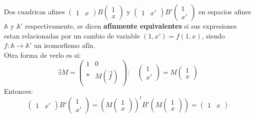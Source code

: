 \begin{definición}
    Dos cuadricas afines $\begin{pmatrix} 1 & x \end{pmatrix} B \begin{pmatrix} 1 \\ x \end{pmatrix}$ y $\begin{pmatrix} 1 & x' \end{pmatrix} B' \begin{pmatrix} 1 \\ x' \end{pmatrix}$ en espacios afines $\mathbb{A}$ y $\mathbb{A}'$ respectivamente, se dicen \textbf{afínmente equivalentes} si sus expresiones estan relacionadas por un cambio de variable $(1, x') = f(1, x)$, siendo $f : \mathbb{A} \to \mathbb{A}'$ un isomorfismo afín.\\
    Otra forma de verlo es si:
    \[
    \exists M =
    \left(
        \begin{array}{c|c}
            1 & 0 \\
            \hline
            * & M(\vec{f})
        \end{array}
    \right) : \quad
    \begin{pmatrix}
        1 \\
        x'
    \end{pmatrix}
    =
    M
    \begin{pmatrix}
        1 \\
        x
    \end{pmatrix}
    \]
    Entonces:
    \[
    \begin{pmatrix}
        1 & x'
    \end{pmatrix}
    B'
    \begin{pmatrix}
        1 \\
        x'
    \end{pmatrix}
    =
    \left(
        M
        \begin{pmatrix}
            1 \\
            x
        \end{pmatrix}
    \right)^t
    B'
    \left(
        M
        \begin{pmatrix}
            1 \\
            x
        \end{pmatrix}
    \right)
    =
    \begin{pmatrix}
        1 & x
    \end{pmatrix}
\]
\end{definición}
